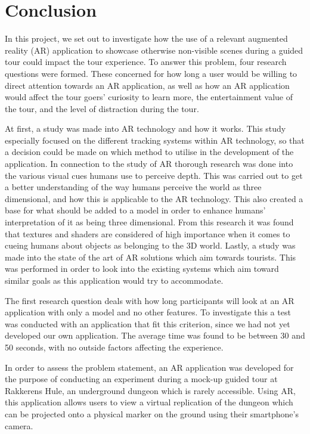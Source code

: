 \chapter{Conclusion}\label{ch:conclusion}
In this project, we set out to investigate how the use of a relevant augmented reality (AR) application to showcase otherwise non-visible scenes during a guided tour could impact the tour experience. To answer this problem, four research questions were formed. These concerned for how long a user would be willing to direct attention towards an AR application, as well as how an AR application would affect the tour goers’ curiosity to learn more, the entertainment value of the tour, and the level of distraction during the tour.

At first, a study was made into AR technology and how it works. This study especially focused on  the different tracking systems within AR technology, so that a decision could be made on which method to utilise in the development of the application. In connection to the study of AR thorough research was done into the various visual cues humans use to perceive depth. This was carried out to get a better understanding of the way humans perceive the world as three dimensional, and how this is applicable to the AR technology. This also created a base for what should be added to a model in order to enhance humans’ interpretation of it as being three dimensional. From this research it was found that textures and shaders are considered of high importance when it comes to cueing humans about objects as belonging to the 3D world. Lastly, a study was made into the state of the art of AR solutions which aim towards tourists. This was performed in order to look into the existing systems which aim toward similar goals as this application would try to accommodate.

The first research question deals with how long participants will look at an AR application with only a model and no other features. To investigate this a test was conducted with an application that fit this criterion, since we had not yet developed our own application. The average time was found to be between 30 and 50 seconds, with no outside factors affecting the experience.

In order to assess the problem statement, an AR application was developed for the purpose of conducting an experiment during a mock-up guided tour at Rakkerens Hule, an underground dungeon which is rarely accessible. Using AR, this application allows users to view a virtual replication of the dungeon which can be projected onto a physical marker on the ground using their smartphone’s camera.

